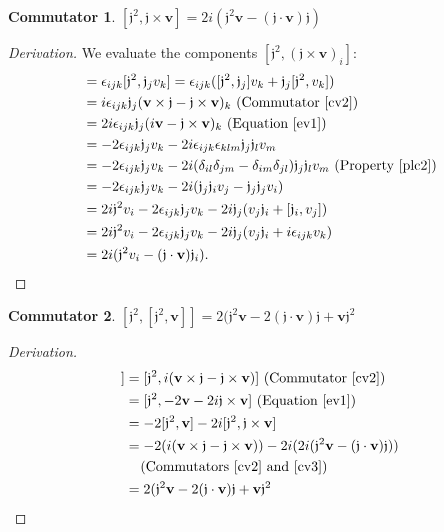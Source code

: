 \documentclass[12pt,a4paper]{report}
\theoremstyle{definition}
\newtheorem{commutator}{Commutator}[section]
\newenvironment{derivation}
  {\renewcommand\qedsymbol{$\square$}\begin{proof}[Derivation]}
  {\end{proof}}
\theoremstyle{remark}
\theoremstyle{remark}
\begin{document}
\begin{appendices}
\begin{commutator}\label{cv3}$[\mathfrak{j}^2,\mathfrak{j}\times\textbf{v}]=2i(\mathfrak{j}^2\textbf{v}-(\mathfrak{j}\cdot\textbf{v})\mathfrak{j})$
\end{commutator}
\begin{derivation}We evaluate the components $[\mathfrak{j}^2,(\mathfrak{j}\times\textbf{v})_i]$:
\begin{align*}
[\mathfrak{j}^2,(\mathfrak{j}\times\textbf{v})_i]&=\epsilon_{ijk}[\mathfrak{j}^2,\mathfrak{j}_jv_k]=\epsilon_{ijk}([\mathfrak{j}^2,\mathfrak{j}_j]v_k+\mathfrak{j}_j[\mathfrak{j}^2,v_k])\\
&=i\epsilon_{ijk}\mathfrak{j}_j(\mathbf{v}\times\mathfrak{j}-\mathfrak{j}\times\mathbf{v})_k \text{ (Commutator~\ref{cv2})}\\
&=2i\epsilon_{ijk}\mathfrak{j}_j(i\textbf{v}-\mathfrak{j}\times\textbf{v})_k \text{ (Equation~\ref{ev1})}\\
&=-2\epsilon_{ijk}\mathfrak{j}_jv_k-2i\epsilon_{ijk}\epsilon_{klm}\mathfrak{j}_j\mathfrak{j}_lv_m\\
&=-2\epsilon_{ijk}\mathfrak{j}_jv_k-2i(\delta_{il}\delta_{jm}-\delta_{im}\delta_{jl})\mathfrak{j}_j\mathfrak{j}_lv_m \text{ (Property~\ref{plc2})}\\
&=-2\epsilon_{ijk}\mathfrak{j}_jv_k-2i(\mathfrak{j}_j\mathfrak{j}_iv_j-\mathfrak{j}_j\mathfrak{j}_jv_i)\\
&=2i\mathfrak{j}^2v_i-2\epsilon_{ijk}\mathfrak{j}_jv_k-2i\mathfrak{j}_j(v_j\mathfrak{j}_i+[\mathfrak{j}_i,v_j])\\
&=2i\mathfrak{j}^2v_i-2\epsilon_{ijk}\mathfrak{j}_jv_k-2i\mathfrak{j}_j(v_j\mathfrak{j}_i+i\epsilon_{ijk}v_k)\\
&=2i(\mathfrak{j}^2v_i-(\mathfrak{j}\cdot\textbf{v})\mathfrak{j}_i).
\end{align*}
\end{derivation}

\begin{commutator}\label{cv4}$[\mathfrak{j}^2,[\mathfrak{j}^2,\textbf{v}]]=2(\mathfrak{j}^2\textbf{v}-2(\mathfrak{j}\cdot\textbf{v})\mathfrak{j}+\mathbf{v}\mathfrak{j}^2$
\end{commutator}
\begin{derivation}
\begin{align*}
[\mathfrak{j}^2,[\mathfrak{j}^2,\textbf{v}]]&=[\mathfrak{j}^2,i(\mathbf{v}\times\mathfrak{j}-\mathfrak{j}\times\mathbf{v})] \text{ (Commutator~\ref{cv2})}\\
&=[\mathfrak{j}^2,-2\textbf{v}-2i\mathfrak{j}\times\mathbf{v}] \text{ (Equation~\ref{ev1})}\\
&=-2[\mathfrak{j}^2,\textbf{v}]-2i[\mathfrak{j}^2,\mathfrak{j}\times\mathbf{v}]\\
&=-2(i(\mathbf{v}\times\mathfrak{j}-\mathfrak{j}\times\mathbf{v}))-2i(2i(\mathfrak{j}^2\textbf{v}-(\mathfrak{j}\cdot\textbf{v})\mathfrak{j}))\\
&\phantom{=} \text{ (Commutators~\ref{cv2} and~\ref{cv3})}\\
&=2(\mathfrak{j}^2\textbf{v}-2(\mathfrak{j}\cdot\textbf{v})\mathfrak{j}+\mathbf{v}\mathfrak{j}^2
\end{align*}
\end{derivation}



\end{appendices}
\end{document}
